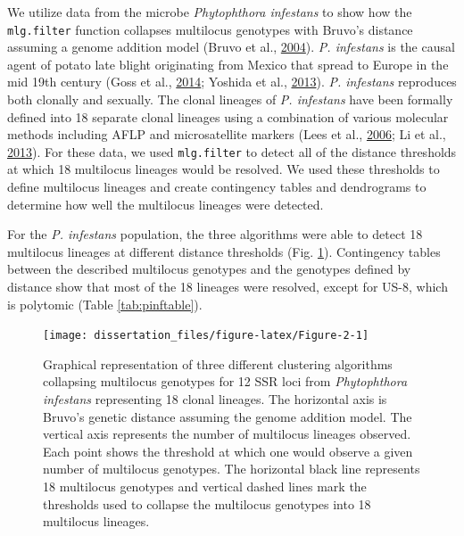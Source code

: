 \documentclass[double,11pt]{beavtex}
\begin{document}
  We utilize data from the microbe \emph{Phytophthora infestans} to show
  how the \texttt{mlg.filter} function collapses multilocus genotypes with
  Bruvo's distance assuming a genome addition model (Bruvo et al.,
  \protect\hyperlink{ref-bruvo2004simple}{2004}). \emph{P. infestans} is
  the causal agent of potato late blight originating from Mexico that
  spread to Europe in the mid 19th century (Goss et al.,
  \protect\hyperlink{ref-goss2014irish}{2014}; Yoshida et al.,
  \protect\hyperlink{ref-yoshida2013rise}{2013}). \emph{P. infestans}
  reproduces both clonally and sexually. The clonal lineages of \emph{P.
  infestans} have been formally defined into 18 separate clonal lineages
  using a combination of various molecular methods including AFLP and
  microsatellite markers (Lees et al.,
  \protect\hyperlink{ref-lees2006novel}{2006}; Li et al.,
  \protect\hyperlink{ref-li2013efficient}{2013}). For these data, we used
  \texttt{mlg.filter} to detect all of the distance thresholds at which 18
  multilocus lineages would be resolved. We used these thresholds to
  define multilocus lineages and create contingency tables and dendrograms
  to determine how well the multilocus lineages were detected.
  
  For the \emph{P. infestans} population, the three algorithms were able
  to detect 18 multilocus lineages at different distance thresholds (Fig.
  \ref{fig:Figure-2}). Contingency tables between the described multilocus
  genotypes and the genotypes defined by distance show that most of the 18
  lineages were resolved, except for US-8, which is polytomic (Table
  \ref{tab:pinftable}).
  
  \begin{figure}
  
  {\centering \texttt{[image: dissertation\_files/figure-latex/Figure-2-1]} 
  
  }
  
  \caption[Graphical representation of three different clustering algorithms
  collapsing multilocus genotypes for 12 SSR loci from \emph{Phytophthora
  infestans} representing 18 clonal lineages.]{Graphical representation of three different clustering algorithms
  collapsing multilocus genotypes for 12 SSR loci from \emph{Phytophthora
  infestans} representing 18 clonal lineages. The horizontal axis is
  Bruvo's genetic distance assuming the genome addition model. The
  vertical axis represents the number of multilocus lineages observed.
  Each point shows the threshold at which one would observe a given number
  of multilocus genotypes. The horizontal black line represents 18
  multilocus genotypes and vertical dashed lines mark the thresholds used
  to collapse the multilocus genotypes into 18 multilocus lineages.}\label{fig:Figure-2}
  \end{figure}
  
\end{document}

